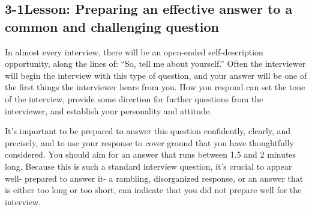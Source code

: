 \pagebreak \subsection*{3-1\quad Lesson: Preparing an effective answer to a common and challenging question}
In almost every interview, there will be an open-ended self-description opportunity, along the lines of: ``So, tell me about yourself.'' Often the interviewer will begin the interview with this type of question, and your answer will be one of the first things the interviewer hears from you. How you respond can set the tone of the interview, provide some direction for further questions from the interviewer, and establish your personality and attitude.

It's important to be prepared to answer this question confidently, clearly, and precisely, and to use your response to cover ground that you have thoughtfully considered. You should aim for an answer that runs between 1.5 and 2 minutes long. Because this is such a standard interview question, it's crucial to appear well- prepared to answer it-	a rambling, disorganized response, or an answer that is either too long or too short, can indicate that you did not prepare well for the interview.

